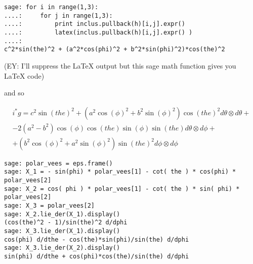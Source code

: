 \documentclass[10pt, twoside]{amsart}
\newcommand{\questionhead}[1]
  {\bigskip\bigskip
   \noindent{\small\bf Question #1.}
   \bigskip}
\begin{document}
\begin{multicols*}{2}
\begin{verbatim}
sage: for i in range(1,3): 
....:     for j in range(1,3):
....:         print inclus.pullback(h)[i,j].expr()
....:         latex(inclus.pullback(h)[i,j].expr() )
....:         
c^2*sin(the)^2 + (a^2*cos(phi)^2 + b^2*sin(phi)^2)*cos(the)^2
\end{verbatim}
(EY: I'll suppress the LaTeX output but this sage math function gives you LaTeX code)
%
%

and so

\[
\boxed{ \begin{gathered}
 i^* g = c^{2} \sin\left(\mathit{the}\right)^{2} + {\left(a^{2} \cos\left(\phi\right)^{2} + b^{2} \sin\left(\phi\right)^{2}\right)} \cos\left(\mathit{the}\right)^{2} d\theta \otimes d\theta + \\
-2 {\left(a^{2} - b^{2}\right)} \cos\left(\phi\right) \cos\left(\mathit{the}\right) \sin\left(\phi\right) \sin\left(\mathit{the}\right) d\theta \otimes d\phi +  \\
 + {\left(b^{2} \cos\left(\phi\right)^{2} + a^{2} \sin\left(\phi\right)^{2}\right)} \sin\left(\mathit{the}\right)^{2} d\phi \otimes d\phi 
\end{gathered} }
\]

\questionhead{}

{\small
\begin{verbatim}
sage: polar_vees = eps.frame()
sage: X_1 = - sin(phi) * polar_vees[1] - cot( the ) * cos(phi) * polar_vees[2]
sage: X_2 = cos( phi ) * polar_vees[1] - cot( the ) * sin( phi) * polar_vees[2]
sage: X_3 = polar_vees[2]
sage: X_2.lie_der(X_1).display()
(cos(the)^2 - 1)/sin(the)^2 d/dphi
sage: X_3.lie_der(X_1).display()
cos(phi) d/dthe - cos(the)*sin(phi)/sin(the) d/dphi
sage: X_3.lie_der(X_2).display()
sin(phi) d/dthe + cos(phi)*cos(the)/sin(the) d/dphi
\end{verbatim}
}


\end{multicols*}
\end{document}

